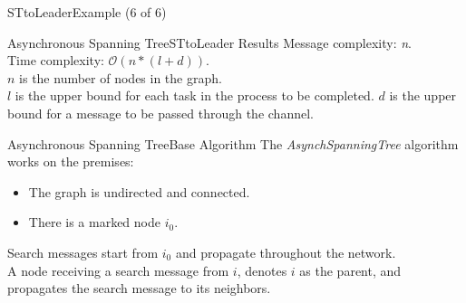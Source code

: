 \documentclass[pdf]{beamer}
\begin{document}
\begin{frame}{STtoLeader}{Example (6 of 6)}
    \begin{center}
    \end{center}
\end{frame}

\begin{frame}{Asynchronous Spanning Tree}{STtoLeader Results}
    Message complexity: \emph{n}.\\
    Time complexity: $\mathcal{O}(n*(l+d))$.\\
    \vspace{12pt}
    $n$ is the number of nodes in the graph.\\
    $l$ is the upper bound for each task in the process to be completed.
    $d$ is the upper bound for a message to be passed through the channel.
\end{frame}

\begin{frame}{Asynchronous Spanning Tree}{Base Algorithm}
    The \emph{AsynchSpanningTree} algorithm works on the premises:
    \begin{itemize}
        \item{The graph is undirected and connected.}
        \pause
        \item{There is a marked node $i_0$.}
    \end{itemize}
    \vspace{12pt}
    \pause
    Search messages start from $i_0$ and propagate throughout the network.\\
    \pause
    \vspace{12pt}
    A node receiving a search message from $i$, denotes $i$ as the parent, and
    propagates the search message to its neighbors.
\end{frame}
\end{document}
